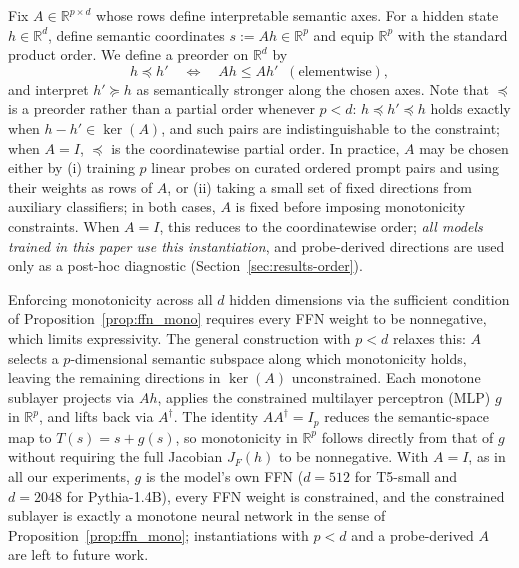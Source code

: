 \documentclass{article}
\theoremstyle{plain}
\theoremstyle{definition}
\theoremstyle{remark}
\begin{document}
Fix $A \in \mathbb{R}^{p \times d}$ whose rows define interpretable semantic axes.
For a hidden state $h \in \mathbb{R}^d$, define semantic coordinates $s := Ah \in \mathbb{R}^p$
and equip $\mathbb{R}^p$ with the standard product order. We define a preorder on
$\mathbb{R}^d$ by
\[
h \preceq h' \quad \Longleftrightarrow \quad Ah \le Ah' \;\; (\text{elementwise}),
\]
and interpret $h' \succeq h$ as semantically stronger along the chosen axes.
Note that $\preceq$ is a preorder rather than a partial order whenever $p < d$: $h \preceq h' \preceq h$ holds exactly when $h - h' \in \ker(A)$, and such pairs are indistinguishable to the constraint; when $A = I$, $\preceq$ is the coordinatewise partial order.
In practice, $A$ may be chosen either by (i) training $p$ linear probes on curated ordered
prompt pairs and using their weights as rows of $A$, or (ii) taking a small set of fixed
directions from auxiliary classifiers; in both cases, $A$ is fixed before imposing
monotonicity constraints. When $A = I$, this reduces to the coordinatewise order;
\emph{all models trained in this paper use this instantiation}, and probe-derived
directions are used only as a post-hoc diagnostic (Section~\ref{sec:results-order}).

Enforcing monotonicity across all $d$ hidden dimensions via the sufficient condition of Proposition~\ref{prop:ffn_mono} requires every FFN weight to be nonnegative, which limits expressivity. The general construction with $p < d$ relaxes this: $A$ selects a $p$-dimensional semantic subspace along which monotonicity holds, leaving the remaining directions in $\ker(A)$ unconstrained. Each monotone sublayer projects via $Ah$, applies the constrained multilayer perceptron (MLP) $g$ in $\mathbb{R}^p$, and lifts back via $A^\dagger$. The identity $AA^\dagger = I_p$ reduces the semantic-space map to $T(s) = s + g(s)$, so monotonicity in $\mathbb{R}^p$ follows directly from that of $g$ without requiring the full Jacobian $J_F(h)$ to be nonnegative. With $A = I$, as in all our experiments, $g$ is the model's own FFN ($d = 512$ for T5-small and $d = 2048$ for Pythia-1.4B), every FFN weight is constrained, and the constrained sublayer is exactly a monotone neural network in the sense of Proposition~\ref{prop:ffn_mono}; instantiations with $p < d$ and a probe-derived $A$ are left to future work.
\end{document}
